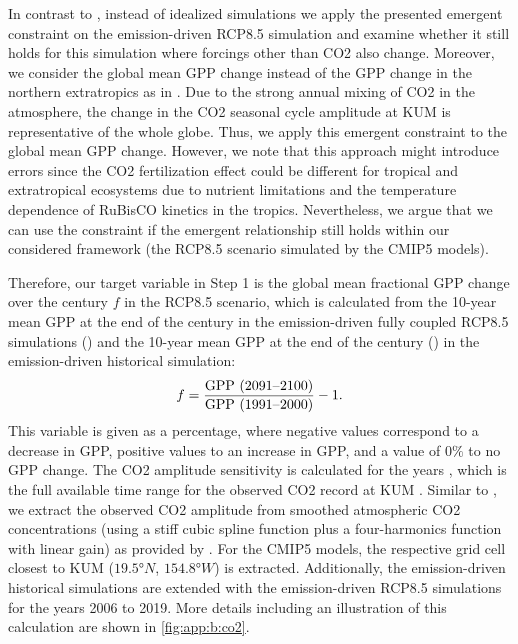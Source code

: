 In contrast to \textcite{Wenzel2016}, instead of idealized simulations we apply
the presented emergent constraint on the emission-driven \acs{RCP}8.5
simulation \autocite{Riahi2011} and examine whether it still holds for this
simulation where forcings other than \ac{CO2} also change. Moreover, we
consider the global mean \ac{GPP} change instead of the \ac{GPP} change in the
northern extratropics as in \textcite{Wenzel2016}. Due to the strong annual
mixing of \ac{CO2} in the atmosphere, the change in the \ac{CO2} seasonal cycle
amplitude at \ac{KUM} is representative of the whole globe. Thus, we apply this
emergent constraint to the global mean \ac{GPP} change. However, we note that
this approach might introduce errors since the \ac{CO2} fertilization effect
could be different for tropical and extratropical ecosystems due to nutrient
limitations and the temperature dependence of \ac{RuBisCO} kinetics
\autocite{CraftsBrandner2000} in the tropics. Nevertheless, we argue that we
can use the constraint if the emergent relationship still holds within our
considered framework (the \acs{RCP}8.5 scenario simulated by the \acs{CMIP}5
models).

Therefore, our target variable in Step 1 is the global mean fractional
\acs{GPP} change over the  century $f$ in the \acs{RCP}8.5 scenario,
which is calculated from the 10-year mean \ac{GPP} at the end of the 
century in the emission-driven fully coupled \acs{RCP}8.5 simulations
() and the 10-year mean \ac{GPP} at the end of the 
century () in the emission-driven historical simulation:
\begin{equation}
  f = \frac{\textnormal{GPP (2091\textnormal{--}2100)}}{
    \textnormal{GPP (1991\textnormal{--}2000)}} - 1.
  \label{eq:06:f}
\end{equation}
This variable is given as a percentage, where negative values correspond to a
decrease in \ac{GPP}, positive values to an increase in \ac{GPP}, and a value
of $0 \unit{\%}$ to no \ac{GPP} change. The \ac{CO2} amplitude sensitivity is
calculated for the years , which is the full available time
range for the observed \ac{CO2} record at \ac{KUM} \autocite{Keeling2005}.
Similar to \textcite{Wenzel2016}, we extract the observed \ac{CO2} amplitude
from smoothed atmospheric \ac{CO2} concentrations (using a stiff cubic spline
function plus a four-harmonics function with linear gain) as provided by
\textcite{Keeling2005}. For the \acs{CMIP}5 models, the respective grid cell
closest to \ac{KUM} ($19.5 \unit{\degree N}$, $154.8 \unit{\degree W}$) is
extracted. Additionally, the emission-driven historical simulations are
extended with the emission-driven \acs{RCP}8.5 simulations for the years 2006
to 2019. More details including an illustration of this calculation are shown
in \cref{fig:app:b:co2}.


